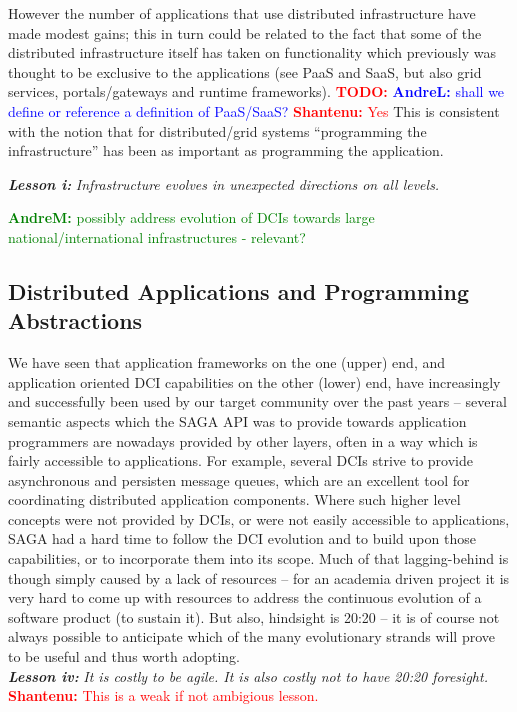 \documentclass{article}
\newcommand{\I}[1]{\textit{#1}}
\newcommand{\B}[1]{\textbf{#1}}
\newcommand{\BI}[1]{\textbf{\textit{#1}}}
\newcommand{\todo}[1]{{\textcolor{red}{\B{TODO:} #1 }}}
\newcommand{\jhanote}[1]{{\textcolor{red}{     \B{Shantenu:} #1 }}}
\newcommand{\amnote}[1]{{\textcolor{green}{   \B{AndreM:  } #1 }}}
\newcommand{\alnote}[1]{{\textcolor{blue}{    \B{AndreL:  } #1 }}}
\newcommand{\todo}[1]{}
\newcommand{\jhanote}[1]{}
\newcommand{\amnote}[1]{}
\newcommand{\alnote}[1]{}
\begin{document}
  However the number of applications that use distributed infrastructure
  have made modest gains; this in turn could be related to the fact that
  some of the distributed infrastructure itself has taken on
  functionality which previously was thought to be exclusive to the
  applications (see PaaS and SaaS, but also grid services,
  portals/gateways and runtime frameworks). \todo{}\alnote{shall we
  define or reference a definition of PaaS/SaaS?}\jhanote{Yes} This is
  consistent with the notion that for distributed/grid systems
  ``programming the infrastructure'' has been as important as
  programming the application.

  \BI{Lesson i:} \I{Infrastructure evolves in unexpected directions  on all
  levels.}

  \amnote{possibly address evolution of DCIs towards large
  national/international infrastructures - relevant?}


 \subsection{Distributed Applications and Programming Abstractions}

  We have seen that application frameworks on the one (upper) end, and
  application oriented DCI capabilities on the other (lower) end, have
  increasingly and successfully been used by our target community over
  the past years -- several semantic aspects which the SAGA API was to
  provide towards application programmers are nowadays provided by other
  layers, often in a way which is fairly accessible to applications.
  For example, several DCIs strive to provide asynchronous and persisten
  message queues, which are an excellent tool for coordinating
  distributed application components.  Where such higher level concepts
  were not provided by DCIs, or were not easily accessible to
  applications, SAGA had a hard time to follow the DCI evolution and to
  build upon those capabilities, or to incorporate them into its scope.
  Much of that lagging-behind is though simply caused by a lack of
  resources -- for an academia driven project it is very hard to come up
  with resources to address the continuous evolution of a software
  product (to sustain it).  But also, hindsight is 20:20 -- it is of
  course not always possible to anticipate which of the many
  evolutionary strands will prove to be useful and thus worth
  adopting.\\
  \BI{Lesson iv:} \I{It is costly to be agile. It is also costly not to
  have 20:20 foresight.} \jhanote{This is a weak if not ambigious
  lesson.}
\end{document}
